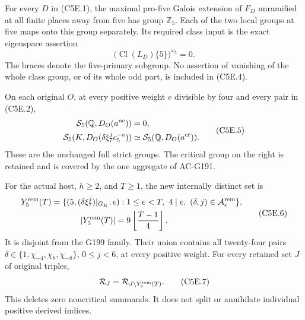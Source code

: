 \begin{theorem}
\label{AC-G205}
For every $D$ in (C5E.1), the maximal pro-five Galois extension
of $F_D$ unramified at all finite places away from five has group
$\mathbb Z_5$.  Each of the two local groups at five maps onto
this group separately.  Its required class input is the exact
eigenspace assertion
\[
               \bigl(\operatorname{Cl}(L_D)\{5\}\bigr)^{\omega_5}=0.
 \tag{C5E.4}
\]
The braces denote the five-primary subgroup.  No assertion of
vanishing of the whole class group, or of its whole odd part,
is included in (C5E.4).

On each original $O$, at every positive weight $e$ divisible
by four and every pair in (C5E.2),
\[
 \begin{aligned}
               \mathcal S_5(\mathbb Q,D_O(a^{\rm nc}))&=0,\\
 \mathcal S_5(K,D_O(\delta\xi_7^j c_5^{-e}))
          &\simeq\mathcal S_5(\mathbb Q,D_O(a^{\rm cr})).
 \end{aligned}
 \tag{C5E.5}
\]
These are the unchanged full strict groups.  The critical group
on the right is retained and is covered by the one aggregate
of AC-G191.

For the actual host, $h\geq2$, and $T\geq1$, the new internally
distinct set is
\[
 \begin{split}
 Y^{\rm rem}_5(T)=\{(5,(\delta\xi_7^j)|_{G_K},e):\;&1\leq e<T,
               \ 4\mid e,\ (\delta,j)\in\mathcal A_e^{\rm rem}\},\\
 |Y^{\rm rem}_5(T)|={}&9\left\lfloor\frac{T-1}{4}\right\rfloor.
 \end{split}
 \tag{C5E.6}
\]
It is disjoint from the G199 family.  Their union contains all
twenty-four pairs $\delta\in\{1,\chi_{-4},\chi_8,\chi_{-8}\}$,
$0\leq j<6$, at every positive weight.  For every retained
set $J$ of original triples,
\[
                 \mathcal R_J
                    =\mathcal R_{J\setminus Y^{\rm rem}_5(T)}.
 \tag{C5E.7}
\]
This deletes zero noncritical summands.  It does not split or
annihilate individual positive derived indices.
\end{theorem}

